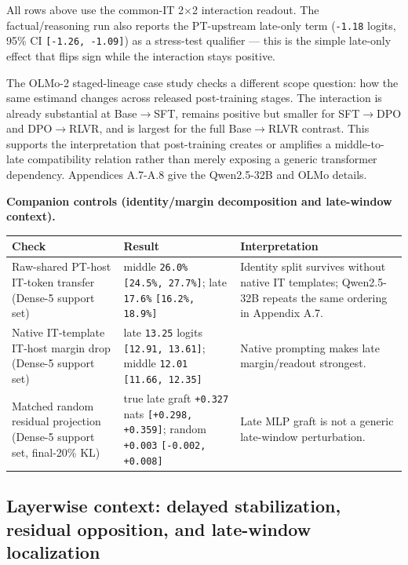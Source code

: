 \documentclass[11pt]{article}
\begin{document}
All rows above use the common-IT 2\ensuremath{\times}2 interaction readout. The factual/reasoning run also reports the PT-upstream late-only term (\texttt{-1.18} logits, 95\% CI \texttt{[-1.26, -1.09]}) as a stress-test qualifier --- this is the simple late-only effect that flips sign while the interaction stays positive.

The OLMo-2 staged-lineage case study checks a different scope question: how the same estimand changes across released post-training stages. The interaction is already substantial at Base\ensuremath{\to}SFT, remains positive but smaller for SFT\ensuremath{\to}DPO and DPO\ensuremath{\to}RLVR, and is largest for the full Base\ensuremath{\to}RLVR contrast. This supports the interpretation that post-training creates or amplifies a middle-to-late compatibility relation rather than merely exposing a generic transformer dependency. Appendices A.7-A.8 give the Qwen2.5-32B and OLMo details.

\textbf{Companion controls (identity/margin decomposition and late-window context).}

\begin{table}[t]
\centering
\small
\setlength{\tabcolsep}{3pt}
\begin{tabularx}{\linewidth}{@{}>{\raggedright\arraybackslash}X >{\raggedright\arraybackslash}X >{\raggedright\arraybackslash}X@{}}
\toprule
Check & Result & Interpretation \\
\midrule
Raw-shared PT-host IT-token transfer (Dense-5 support set) & middle \texttt{26.0\%} \texttt{[24.5\%, 27.7\%]}; late \texttt{17.6\%} \texttt{[16.2\%, 18.9\%]} & Identity split survives without native IT templates; Qwen2.5-32B repeats the same ordering in Appendix A.7. \\
Native IT-template IT-host margin drop (Dense-5 support set) & late \texttt{13.25} logits \texttt{[12.91, 13.61]}; middle \texttt{12.01} \texttt{[11.66, 12.35]} & Native prompting makes late margin/readout strongest. \\
Matched random residual projection (Dense-5 support set, final-20\% KL) & true late graft \texttt{+0.327} nats \texttt{[+0.298, +0.359]}; random \texttt{+0.003} \texttt{[-0.002, +0.008]} & Late MLP graft is not a generic late-window perturbation. \\
\bottomrule
\end{tabularx}
\end{table}

\subsection{Layerwise context: delayed stabilization, residual opposition, and late-window localization}
\end{document}
